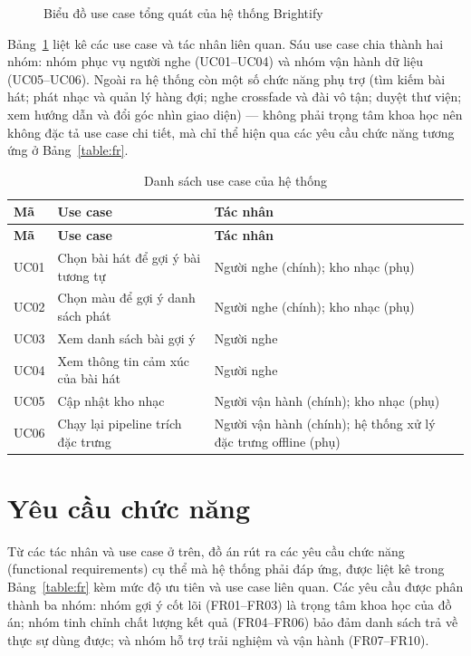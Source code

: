 \documentclass[../DoAn.tex]{subfiles}
\begin{document}
\begin{figure}[tbp]
{}
\caption{Biểu đồ use case tổng quát của hệ thống Brightify}
\label{fig:usecase}
\end{figure}

Bảng~\ref{table:uclist} liệt kê các use case và tác nhân liên quan. Sáu use case chia thành hai nhóm: nhóm phục vụ người nghe (UC01--UC04) và nhóm vận hành dữ liệu (UC05--UC06). Ngoài ra hệ thống còn một số chức năng phụ trợ (tìm kiếm bài hát; phát nhạc và quản lý hàng đợi; nghe crossfade và đài vô tận; duyệt thư viện; xem hướng dẫn và đổi góc nhìn giao diện) --- không phải trọng tâm khoa học nên không đặc tả use case chi tiết, mà chỉ thể hiện qua các yêu cầu chức năng tương ứng ở Bảng~\ref{table:fr}.

\begin{longtable}{|p{1.2cm}|p{6.0cm}|p{6.0cm}|}
\caption{Danh sách use case của hệ thống}\label{table:uclist}\\
\hline
\textbf{Mã} & \textbf{Use case} & \textbf{Tác nhân} \\
\hline
\endfirsthead
\hline
\textbf{Mã} & \textbf{Use case} & \textbf{Tác nhân} \\
\hline
\endhead
UC01 & Chọn bài hát để gợi ý bài tương tự & Người nghe (chính); kho nhạc (phụ) \\
\hline
UC02 & Chọn màu để gợi ý danh sách phát & Người nghe (chính); kho nhạc (phụ) \\
\hline
UC03 & Xem danh sách bài gợi ý & Người nghe \\
\hline
UC04 & Xem thông tin cảm xúc của bài hát & Người nghe \\
\hline
UC05 & Cập nhật kho nhạc & Người vận hành (chính); kho nhạc (phụ) \\
\hline
UC06 & Chạy lại pipeline trích đặc trưng & Người vận hành (chính); hệ thống xử lý đặc trưng offline (phụ) \\
\hline
\end{longtable}

\section{Yêu cầu chức năng}
\label{section:2.fr}
Từ các tác nhân và use case ở trên, đồ án rút ra các yêu cầu chức năng (functional requirements) cụ thể mà hệ thống phải đáp ứng, được liệt kê trong Bảng~\ref{table:fr} kèm mức độ ưu tiên và use case liên quan. Các yêu cầu được phân thành ba nhóm: nhóm gợi ý cốt lõi (FR01--FR03) là trọng tâm khoa học của đồ án; nhóm tinh chỉnh chất lượng kết quả (FR04--FR06) bảo đảm danh sách trả về thực sự dùng được; và nhóm hỗ trợ trải nghiệm và vận hành (FR07--FR10).
\end{document}
